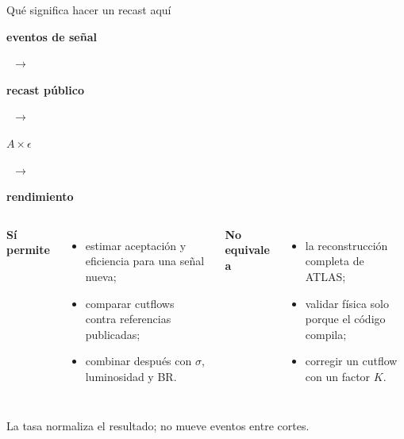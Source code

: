 \documentclass[aspectratio=169,10pt]{beamer}
\newcommand{\pill}[1]{\colorbox{softblue}{\strut\textcolor{deepblue}{\textbf{#1}}}}
\begin{document}
\begin{frame}{Qué significa hacer un recast aquí}
  \centering
  \vspace{0.3em}
  \pill{eventos de señal}\ $\longrightarrow$ \pill{recast público}\ $\longrightarrow$ \pill{$A\times\epsilon$}\ $\longrightarrow$ \pill{rendimiento}
  \vspace{1.2em}
  \begin{columns}[T]
      \textbf{Sí permite}
      \begin{itemize}
        \item estimar aceptación y eficiencia para una señal nueva;
        \item comparar cutflows contra referencias publicadas;
        \item combinar después con $\sigma$, luminosidad y BR.
      \end{itemize}
      \textbf{No equivale a}
      \begin{itemize}
        \item la reconstrucción completa de ATLAS;
        \item validar física solo porque el código compila;
        \item corregir un cutflow con un factor $K$.
      \end{itemize}
  \end{columns}
  \vfill
  \centering La tasa normaliza el resultado; no mueve eventos entre cortes.
\end{frame}
\end{document}
